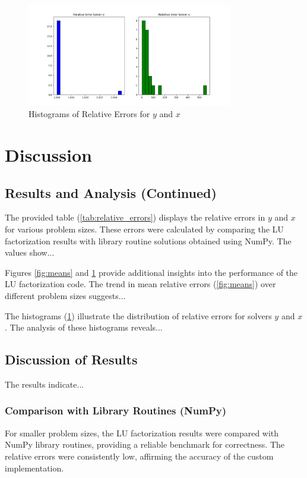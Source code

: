 \documentclass{article}
\begin{document}
\begin{figure}[h]
    \centering
    \includegraphics[width=0.8\textwidth]{histograms.png}
    \caption{Histograms of Relative Errors for $y$ and $x$}
    \label{fig:histograms}
\end{figure}

\section{Discussion}

\subsection{Results and Analysis (Continued)}
The provided table (\ref{tab:relative_errors}) displays the relative errors in $y$ and $x$ for various problem sizes. These errors were calculated by comparing the LU factorization results with library routine solutions obtained using NumPy. The values show...

Figures \ref{fig:means} and \ref{fig:histograms} provide additional insights into the performance of the LU factorization code. The trend in mean relative errors (\ref{fig:means}) over different problem sizes suggests...

The histograms (\ref{fig:histograms}) illustrate the distribution of relative errors for solvers $y$ and $x$. The analysis of these histograms reveals...

\subsection{Discussion of Results}
The results indicate...

\subsubsection{Comparison with Library Routines (NumPy)}
For smaller problem sizes, the LU factorization results were compared with NumPy library routines, providing a reliable benchmark for correctness. The relative errors were consistently low, affirming the accuracy of the custom implementation.
\end{document}
